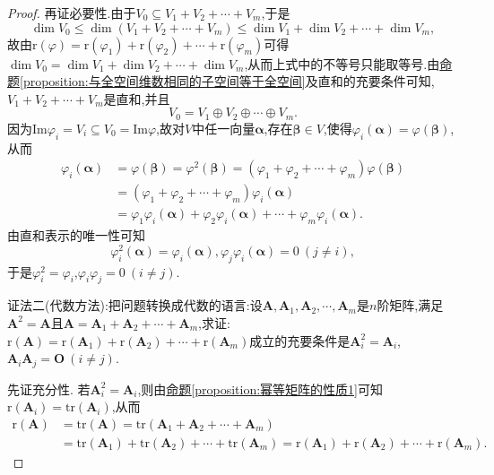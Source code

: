 \documentclass[lang=cn,newtx,10pt,scheme=chinese]{elegantbook}
\begin{document}
\begin{proof}
再证必要性.由于\(V_0\subseteq V_1 + V_2+\cdots+V_m\),于是
\[
\dim V_0\leq\dim(V_1 + V_2+\cdots+V_m)\leq\dim V_1+\dim V_2+\cdots+\dim V_m,
\]
故由\(\text{r}(\varphi)=\text{r}(\varphi_1)+\text{r}(\varphi_2)+\cdots+\text{r}(\varphi_m)\)可得\(\dim V_0=\dim V_1+\dim V_2+\cdots+\dim V_m\),从而上式中的不等号只能取等号.由\hyperref[proposition:与全空间维数相同的子空间等于全空间]{命题\ref{proposition:与全空间维数相同的子空间等于全空间}}及直和的充要条件可知,\(V_1 + V_2+\cdots+V_m\)是直和,并且
\[
V_0 = V_1\oplus V_2\oplus\cdots\oplus V_m.
\]
因为\(\text{Im}\varphi_i = V_i\subseteq V_0 = \text{Im}\varphi\),故对\(V\)中任一向量\(\boldsymbol{\alpha}\),存在\(\boldsymbol{\beta}\in V\),使得\(\varphi_i(\boldsymbol{\alpha})=\varphi(\boldsymbol{\beta})\),从而
\begin{align*}
\varphi_i(\boldsymbol{\alpha})&=\varphi(\boldsymbol{\beta})=\varphi^2(\boldsymbol{\beta})=(\varphi_1+\varphi_2+\cdots+\varphi_m)\varphi(\boldsymbol{\beta})\\
&=(\varphi_1+\varphi_2+\cdots+\varphi_m)\varphi_i(\boldsymbol{\alpha})\\
&=\varphi_1\varphi_i(\boldsymbol{\alpha})+\varphi_2\varphi_i(\boldsymbol{\alpha})+\cdots+\varphi_m\varphi_i(\boldsymbol{\alpha}).
\end{align*}
由直和表示的唯一性可知
\[
\varphi_i^2(\boldsymbol{\alpha})=\varphi_i(\boldsymbol{\alpha}),\varphi_j\varphi_i(\boldsymbol{\alpha}) = 0\ (j\neq i),
\]
于是\(\varphi_i^2 = \varphi_i\),\(\varphi_i\varphi_j = 0\ (i\neq j)\).

{\color{blue}证法二(代数方法):}把问题转换成代数的语言:设\(\boldsymbol{A},\boldsymbol{A}_1,\boldsymbol{A}_2,\cdots,\boldsymbol{A}_m\)是\(n\)阶矩阵,满足\(\boldsymbol{A}^2 = \boldsymbol{A}\)且\(\boldsymbol{A}=\boldsymbol{A}_1+\boldsymbol{A}_2+\cdots+\boldsymbol{A}_m\),求证:\(\text{r}(\boldsymbol{A})=\text{r}(\boldsymbol{A}_1)+\text{r}(\boldsymbol{A}_2)+\cdots+\text{r}(\boldsymbol{A}_m)\)成立的充要条件是\(\boldsymbol{A}_i^2 = \boldsymbol{A}_i\),\(\boldsymbol{A}_i\boldsymbol{A}_j = \boldsymbol{O}\ (i\neq j)\).

先证充分性. 若\(\boldsymbol{A}_i^2 = \boldsymbol{A}_i\),则由\hyperref[proposition:幂等矩阵的性质1]{命题\ref{proposition:幂等矩阵的性质1}}可知\(\text{r}(\boldsymbol{A}_i)=\text{tr}(\boldsymbol{A}_i)\),从而
\begin{align*}
\text{r}(\boldsymbol{A})&=\text{tr}(\boldsymbol{A})=\text{tr}(\boldsymbol{A}_1+\boldsymbol{A}_2+\cdots+\boldsymbol{A}_m)\\
&=\text{tr}(\boldsymbol{A}_1)+\text{tr}(\boldsymbol{A}_2)+\cdots+\text{tr}(\boldsymbol{A}_m)=\text{r}(\boldsymbol{A}_1)+\text{r}(\boldsymbol{A}_2)+\cdots+\text{r}(\boldsymbol{A}_m).
\end{align*}


\end{proof}
\end{document}
